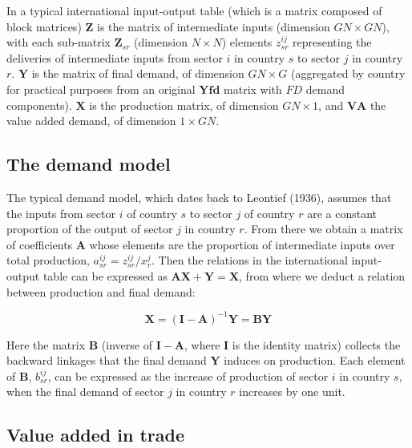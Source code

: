 In a typical international input-output table (which is a matrix composed of
block matrices) \(\mathbf{Z}\) is the matrix of intermediate inputs (dimension \(GN \times GN\)), with each sub-matrix \(\mathbf{Z}_{sr}\) (dimension \(N \times N\))
elements \(z_{sr}^{ij}\) representing the deliveries of intermediate inputs from
sector \(i\) in country \(s\) to sector \(j\) in country \(r\). \(\mathbf{Y}\) is the
matrix of final demand, of dimension \(GN \times G\) (aggregated by country for
practical purposes from an original \(\mathbf{Yfd}\) matrix with \(FD\) demand
components). \(\mathbf{X}\) is the production matrix, of dimension \(GN \times 1\),
and \(\mathbf{VA}\) the value added demand, of dimension \(1 \times GN\).

\hypertarget{the-demand-model}{%
\subsection{The demand model}\label{the-demand-model}}

The typical demand model, which dates back to
Leontief (1936), assumes that the inputs from sector \(i\) of country
\(s\) to sector \(j\) of country \(r\) are a constant proportion of the output of
sector \(j\) in country \(r\). From there we obtain a matrix of coefficients
\(\mathbf{A}\) whose elements are the proportion of intermediate inputs over total
production, \(a_{sr}^{ij} = z_{sr}^{ij} / {x_{r}^{j}}\). Then the relations in the
international input-output table can be expressed as
\(\mathbf{AX}+\mathbf{Y}=\mathbf{X}\), from where we deduct a relation between
production and final demand:

\begin{equation}
  \mathbf{X}=\left(\mathbf{I}-\mathbf{A}\right)^{-1}\mathbf{Y}=\mathbf{BY}
   \label{eq:XBY}
\end{equation}

Here the matrix \(\mathbf{B}\) (inverse of \(\mathbf{I} -\mathbf{A}\), where
\(\mathbf{I}\) is the identity matrix) collects the backward linkages that the
final demand \(\mathbf{Y}\) induces on production. Each element of \(\mathbf{B}\),
\(b_{sr}^{ij}\), can be expressed as the increase of production of sector \(i\) in
country \(s\), when the final demand of sector \(j\) in country \(r\) increases by one
unit.

\hypertarget{value-added-in-trade}{%
\subsection{Value added in trade}\label{value-added-in-trade}}

